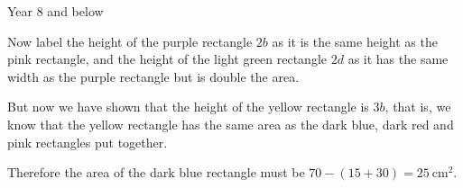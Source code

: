\begin{MyInnerBox}{Year 8 and below}
{\begin{MySolutionBox}
        Now label the height of the purple rectangle \(2b\) as it is the same height as the pink rectangle, and the height of the light green rectangle \(2d\) as it has the same width as the purple rectangle but is double the area.\par
        But now we have shown that the height of the yellow rectangle is \(3b\), that is, we know that the yellow rectangle has the same area as the dark blue, dark red and pink rectangles put together.\par
        Therefore the area of the dark blue rectangle must be \(70-(15+30)=\SI{25}{\square\cm}\).\par
      \end{MySolutionBox}
    }{}%
    \end{MyInnerBox}

